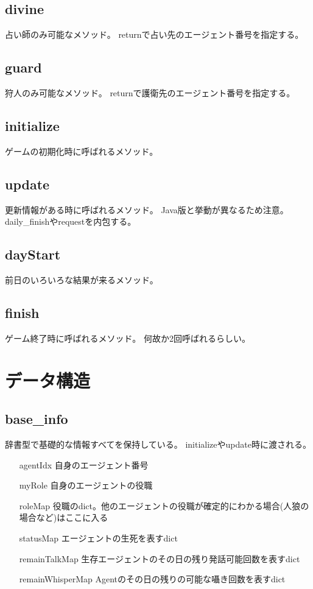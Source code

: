 \documentclass[a4j,twocolumn]{jarticle}
\begin{document}
  \subsection{divine}
    占い師のみ可能なメソッド。
    returnで占い先のエージェント番号を指定する。
  \subsection{guard}
    狩人のみ可能なメソッド。
    returnで護衛先のエージェント番号を指定する。
  \subsection{initialize}
    ゲームの初期化時に呼ばれるメソッド。
  \subsection{update}
    更新情報がある時に呼ばれるメソッド。
    Java版と挙動が異なるため注意。
    daily\_finishやrequestを内包する。
  \subsection{dayStart}
    前日のいろいろな結果が来るメソッド。
  \subsection{finish}
    ゲーム終了時に呼ばれるメソッド。
    何故か2回呼ばれるらしい。
\section{データ構造}
  \subsection{base\_info}
    辞書型で基礎的な情報すべてを保持している。
    initializeやupdate時に渡される。
    \begin{itemize}
      \item[agentIdx] 自身のエージェント番号
      \item[myRole] 自身のエージェントの役職
      \item[roleMap] 役職のdict。他のエージェントの役職が確定的にわかる場合(人狼の場合など)はここに入る
      \item[statusMap] エージェントの生死を表すdict
      \item[remainTalkMap] 生存エージェントのその日の残り発話可能回数を表すdict
      \item[remainWhisperMap] Agentのその日の残りの可能な囁き回数を表すdict
    \end{itemize}
\end{document}
